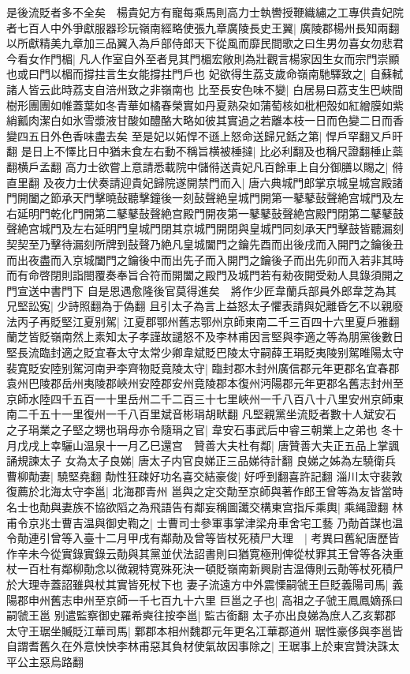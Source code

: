 是後流貶者多不全矣　楊貴妃方有寵每乘馬則高力士執轡授鞭織繡之工專供貴妃院者七百人中外爭獻服器珍玩嶺南經略使張九章廣陵長史王翼|{
	廣陵郡楊州長知兩翻}
以所獻精美九章加三品翼入為戶部侍郎天下從風而靡民間歌之曰生男勿喜女勿悲君今看女作門楣|{
	凡人作室自外至者見其門楣宏敞則為壯觀言楊家因生女而宗門崇顯也或曰門以楣而撐拄言生女能撐拄門戶也}
妃欲得生荔支歲命嶺南馳驛致之|{
	自蘇軾諸人皆云此時荔支自涪州致之非嶺南也}
比至長安色味不變|{
	白居易曰荔支生巴峽間樹形團團如帷蓋葉如冬青華如橘春榮實如丹夏熟朶如蒲萄核如枇杷殻如紅繒膜如紫綃瓤肉潔白如氷雪漿液甘酸如醴酪大略如彼其實過之若離本枝一日而色變二日而香變四五日外色香味盡去矣}
至是妃以妬悍不遜上怒命送歸兄銛之第|{
	悍戶罕翻又戶旰翻}
是日上不懌比日中猶未食左右動不稱旨横被棰撻|{
	比必利翻及也稱尺證翻棰止蘂翻横戶孟翻}
高力士欲嘗上意請悉載院中儲偫送貴妃凡百餘車上自分御膳以賜之|{
	偫直里翻}
及夜力士伏奏請迎貴妃歸院遂開禁門而入|{
	唐六典城門郎掌京城皇城宫殿諸門開闔之節承天門擊曉鼔聽擊鐘後一刻鼔聲絶皇城門開第一鼕鼕鼔聲絶宫城門及左右延明門乾化門開第二鼕鼕鼔聲絶宫殿門開夜第一鼕鼕鼔聲絶宫殿門閉第二鼕鼕鼓聲絶宫城門及左右延明門皇城門閉其京城門開閉與皇城門同刻承天門擊鼓皆聽漏刻契契至乃擊待漏刻所牌到鼔聲乃絶凡皇城闔門之鑰先酉而出後戌而入開門之鑰後丑而出夜盡而入京城闔門之鑰後中而出先子而入開門之鑰後子而出先卯而入若非其時而有命啓閉則詣閤覆奏奉旨合符而開闔之殿門及城門若有勑夜開受勑人具錄須開之門宣送中書門下}
自是恩遇愈隆後官莫得進矣　將作少匠韋蘭兵部員外郎韋芝為其兄堅訟寃|{
	少詩照翻為于偽翻}
且引太子為言上益怒太子懼表請與妃離昏乞不以親廢法丙子再貶堅江夏别駕|{
	江夏郡鄂州舊志鄂州京師東南二千三百四十六里夏戶雅翻}
蘭芝皆貶嶺南然上素知太子孝謹故譴怒不及李林甫因言堅與李適之等為朋黨後數日堅長流臨封適之貶宜春太守太常少卿韋斌貶巴陵太守嗣薛王琄貶夷陵别駕睢陽太守裴寛貶安陸别駕河南尹李齊物貶竟陵太守|{
	臨封郡木封州廣信郡元年更郡名宜春郡袁州巴陵郡岳州夷陵郡峽州安陸郡安州竟陵郡本復州沔陽郡元年更郡名舊志封州至京師水陸四千五百一十里岳州二千二百三十七里峽州一千八百八十八里安州京師東南二千五十一里復州一千八百里斌音彬琄胡畎翻}
凡堅親黨坐流貶者數十人斌安石之子琄業之子堅之甥也琄母亦令隨琄之官|{
	韋安石事武后中睿三朝業上之弟也}
冬十月戊戌上幸驪山温泉十一月乙巳還宫　贊善大夫杜有鄰|{
	唐贊善大夫正五品上掌諷誦規諫太子}
女為太子良娣|{
	唐太子内官良娣正三品娣待計翻}
良娣之姊為左驍衛兵曹柳勣妻|{
	驍堅堯翻}
勣性狂疎好功名喜交結豪俊|{
	好呼到翻喜許記翻}
淄川太守裴敦復薦於北海太守李邕|{
	北海郡青州}
邕與之定交勣至京師與著作郎王曾等為友皆當時名士也勣與妻族不協欲䧟之為飛語告有鄰妄稱圖讖交構東宫指斥乘輿|{
	乘䋲證翻}
林甫令京兆士曹吉温與御史鞫之|{
	士曹司士參軍事掌津梁舟車舍宅工藝}
乃勣首謀也温令勣連引曾等入臺十二月甲戌有鄰勣及曾等皆杖死積尸大理　|{
	考異曰舊紀唐歷皆作辛未今從實錄實錄云勣與其黨並伏法詔書則曰猶寛極刑俾從杖罪其王曾等各決重杖一百杜有鄰柳勣念以微親特寛殊死決一頓貶嶺南新興尉吉温傳則云勣等杖死積尸於大理寺蓋詔雖與杖其實皆死杖下也}
妻子流遠方中外震慄嗣虢王巨貶義陽司馬|{
	義陽郡申州舊志申州至京師一千七百九十六里}
巨邕之子也|{
	高祖之子虢王鳳鳳嫡孫曰嗣虢王邕}
别遣監察御史羅希奭往按李邕|{
	監古銜翻}
太子亦出良娣為庶人乙亥鄴郡太守王琚坐贓貶江華司馬|{
	鄴郡本相州魏郡元年更名冮華郡道州}
琚性豪侈與李邕皆自謂耆舊久在外意怏怏李林甫惡其負材使氣故因事除之|{
	王琚事上於東宫贊決誅太平公主惡烏路翻}


